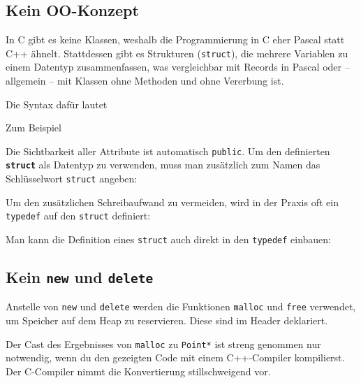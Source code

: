 \subsection{Kein OO-Konzept}
In C gibt es keine Klassen, weshalb die Programmierung in C eher Pascal statt C++ ähnelt.
Stattdessen gibt es Strukturen (\lstinline{struct}), die mehrere Variablen zu einem Datentyp zusammenfassen, was vergleichbar mit Records in Pascal oder -- allgemein -- mit Klassen ohne Methoden und ohne Vererbung ist.

Die Syntax dafür lautet


Zum Beispiel


Die Sichtbarkeit aller Attribute ist automatisch \lstinline{public}.
Um den definierten \textbf{\lstinline|struct|} als Datentyp zu verwenden, muss man zusätzlich zum Namen das Schlüsselwort \lstinline{struct} angeben:


Um den zusätzlichen Schreibaufwand zu vermeiden, wird in der Praxis oft ein \lstinline{typedef} auf den \lstinline{struct} definiert:


Man kann die Definition eines \lstinline{struct} auch direkt in den \lstinline{typedef} einbauen:


\subsection{Kein \lstinline{new} und \lstinline{delete}}

Anstelle von \lstinline{new} und \lstinline{delete} werden die Funktionen \lstinline{malloc} und \lstinline{free} verwendet, um Speicher auf dem Heap zu reservieren.
Diese sind im Header  deklariert.

  
Der Cast des Ergebnisses von \lstinline|malloc| zu \lstinline|Point*| ist streng genommen nur notwendig, wenn du den gezeigten Code mit einem C++-Compiler kompilierst.
Der C-Compiler nimmt die Konvertierung stillschweigend vor.


